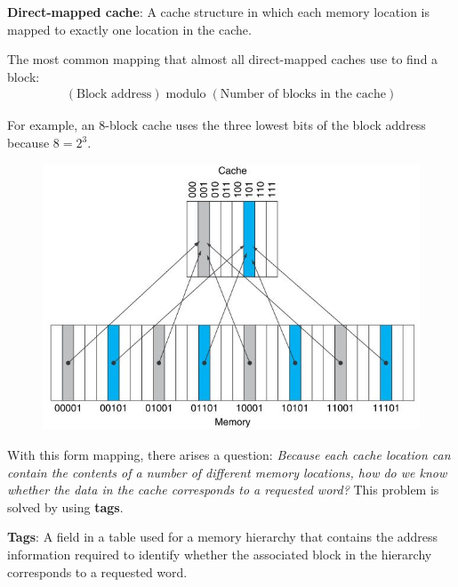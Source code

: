 \documentclass[10pt,a4paper]{article}
\begin{document}
\begin{tcolorbox}[breakable,colback=white]
\textbf{Direct-mapped cache}: A cache structure in which each memory location is mapped to exactly
one location in the cache.
\end{tcolorbox}

The most common mapping that almost all direct-mapped caches use to find a block:
\begin{align*}
    (\text{Block address}) \; \text{modulo} \; (\text{Number of blocks in the cache})
\end{align*}

For example, an 8-block cache uses the three lowest bits of the block address because $8 = 2^3$.

\pagebreak

\begin{figure} [h!]
    \centering
    \includegraphics[scale=0.7]{Mod.JPG}
\end{figure}

With this form mapping, there arises a question: \textit{Because each cache location can contain the
contents of a number of different memory locations, how do we know whether the data in the cache
corresponds to a requested word?} This problem is solved by using \textbf{tags}.

\begin{tcolorbox}[breakable,colback=white]
\textbf{Tags}:  A field in a table used for a memory hierarchy that contains the address information required 
to identify whether the associated block in the hierarchy corresponds to a requested word.
\end{tcolorbox}
\end{document}
